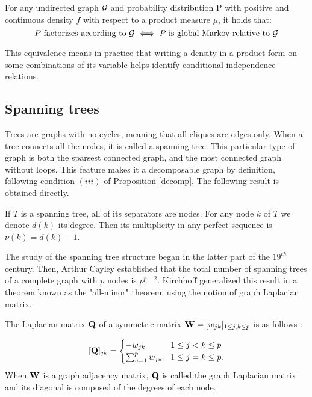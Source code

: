 \begin{theorem} \label{thm:ham}
For any undirected graph $\mathcal{G}$ and probability distribution P with positive and continuous density $f$ with respect to a product measure $\mu$, it holds that:
$$P\text{ factorizes according to } \mathcal{G} \iff P\text{ is global Markov relative to }\mathcal{G} $$
\end{theorem}

This equivalence means in practice that writing a density in a product form on some combinations of its variable helps identify conditional independence relations.

 \subsection{Spanning trees}
Trees are graphs with no cycles, meaning that all cliques are edges only. When a tree connects all the nodes, it is called a spanning tree. This particular type of graph is both the sparsest connected graph, and the most connected graph without loops. This feature makes it a decomposable graph by definition, following condition $(iii)$ of Proposition \ref{decomp}.  The following result is obtained directly.

\begin{prop}
If $T$ is a spanning tree, all of its separators are nodes. For any node $k$ of $T$ we denote $d(k)$ its degree. Then its multiplicity in any perfect sequence is $\nu(k) = d(k)-1$.
\end{prop}
 
 
 The study of the spanning tree structure began in the latter part of the $19^{th}$ century. Then, Arthur Cayley established that the total number of spanning trees of a complete graph with $p$ nodes is $p^{p-2}$. Kirchhoff generalized this result in a theorem known as the "all-minor" theorem, using the notion of graph Laplacian matrix.
  \begin{definition}
 \label{laplacian}
 The Laplacian matrix ${\bf Q}$ of a symmetric matrix ${\bf W}=[w_{jk} ]_{1\leq j,k\leq p}$ is as follows :

\[
 [{\bf Q}]_{jk}  =\begin{cases}
    -w_{jk}  & 1\leq j<k \leq p\\
    \sum_{u=1}^p w_{ju} & 1\leq j=k \leq p.
    \end{cases}
\]
When ${\bf W}$ is a graph adjacency matrix, ${\bf Q}$ is called the graph Laplacian matrix and its diagonal is composed of the degrees of each node.
 \end{definition}
 
